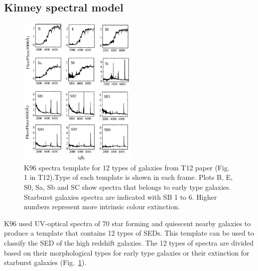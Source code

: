  \subsection{Kinney spectral model}
     \begin{figure}
        \centering
        \includegraphics[width=0.5\textwidth]{../images/k96.jpg}
        \caption{K96 spectra template for 12 types of galaxies from T12 paper (Fig. 1 in T12).Type of each template is shown in each frame. Plots B, E, S0, Sa, Sb and SC show spectra that belongs to early type galaxies. Starburst galaxies spectra are indicated with SB 1 to 6. Higher numbers represent more intrinsic colour extinction.}
        \label{fig: k96}
    \end{figure}
      
    K96 used UV-optical spectra of 70 star forming and quiescent nearby galaxies to produce a template that contains 12 types of SEDs.
    This template can be used to classify the SED of the high redshift galaxies. 
    The 12 types of spectra are divided based on their morphological types for early type galaxies or their extinction for starburst galaxies (Fig.~\ref{fig: k96}). 

